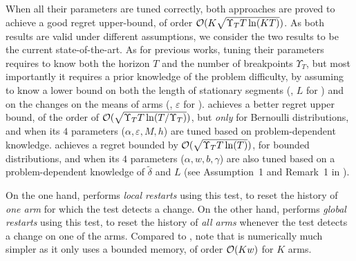 When all their parameters are tuned correctly, both approaches are proved to achieve a good regret upper-bound, of order $\mathcal{O}(K \sqrt{\Upsilon_T T \ln(K T)})$.
As both results are valid under different assumptions, we consider the two results to be the current state-of-the-art.
As for previous works, tuning their parameters requires to know both the horizon $T$ and the number of breakpoints $\Upsilon_T$, but most importantly it requires a prior knowledge of the problem difficulty, by assuming to know a lower bound on both the length of stationary segments (\eg, $L$ for \MUCB) and on the changes on the means of arms (\eg, $\varepsilon$ for \CUSUM).
%
\CUSUMUCB{} achieves a better regret upper bound, of the order of $\mathcal{O}(\sqrt{\Upsilon_T T \ln(T / \Upsilon_T)})$, but \emph{only} for Bernoulli distributions,
and when its $4$ parameters ($\alpha,\varepsilon,M,h$) are tuned based on problem-dependent knowledge.
%
\MUCB{} achieves a regret bounded by $\mathcal{O}(\sqrt{\Upsilon_T T \ln(T)})$, for bounded distributions, and when its $4$ parameters ($\alpha,w,b,\gamma$) are also tuned based on a problem-dependent knowledge of $\tilde{\delta}$ and $L$ (see Assumption~1 and Remark~1 in \cite{CaoZhenKvetonXie18}).


On the one hand, \CUSUMUCB{} performs \emph{local restarts} using this test, to reset the history of \emph{one arm} for which the test detects a change.
On the other hand, \MUCB{} performs \emph{global restarts} using this test, to reset the history of \emph{all arms} whenever the test detects a change on one of the arms.
Compared to \CUSUMUCB{}, note that \MUCB{} is numerically much simpler as it only uses a bounded memory, of order $\mathop{}\mathopen{}\mathcal{O}\mathopen{}\left(K w\right)$ for $K$ arms.

